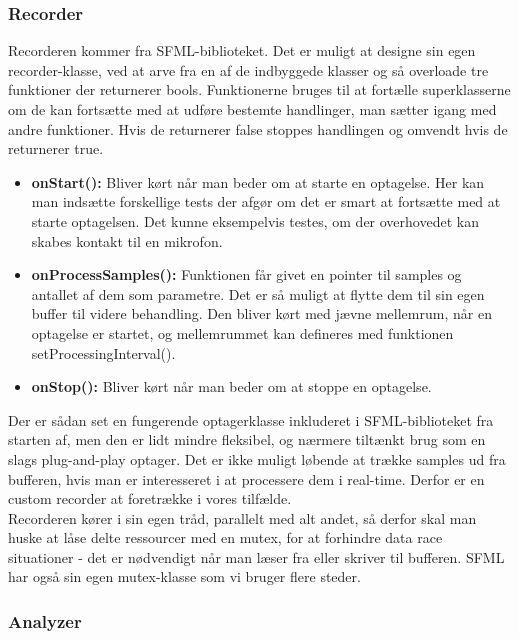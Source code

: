 \subsubsection{Recorder}

Recorderen kommer fra SFML-biblioteket. Det er muligt at designe sin egen recorder-klasse, ved at arve fra en af de indbyggede klasser og så overloade tre funktioner der returnerer bools. Funktionerne bruges til at fortælle superklasserne om de kan fortsætte med at udføre bestemte handlinger, man sætter igang med andre funktioner. Hvis de returnerer false stoppes handlingen og omvendt hvis de returnerer true.

\begin{itemize}

\item \textbf{onStart():} Bliver kørt når man beder om at starte en optagelse. Her kan man indsætte forskellige tests der afgør om det er smart at fortsætte med at starte optagelsen. Det kunne eksempelvis testes, om der overhovedet kan skabes kontakt til en mikrofon.

\item \textbf{onProcessSamples():} Funktionen får givet en pointer til samples og antallet af dem som parametre. Det er så muligt at flytte dem til sin egen buffer til videre behandling. Den bliver kørt med jævne mellemrum, når en optagelse er startet, og mellemrummet kan defineres med funktionen setProcessingInterval(). 

\item \textbf{onStop():} Bliver kørt når man beder om at stoppe en optagelse.

\end{itemize}

Der er sådan set en fungerende optagerklasse inkluderet i SFML-biblioteket fra starten af, men den er lidt mindre fleksibel, og nærmere tiltænkt brug som en slags plug-and-play optager. Det er ikke muligt løbende at trække samples ud fra bufferen, hvis man er interesseret i at processere dem i real-time. Derfor er en custom recorder at foretrække i vores tilfælde. \\
Recorderen kører i sin egen tråd, parallelt med alt andet, så derfor skal man huske at låse delte ressourcer med en mutex, for at forhindre data race situationer - det er nødvendigt når man læser fra eller skriver til bufferen. SFML har også sin egen mutex-klasse som vi bruger flere steder.

\subsubsection{Analyzer}

